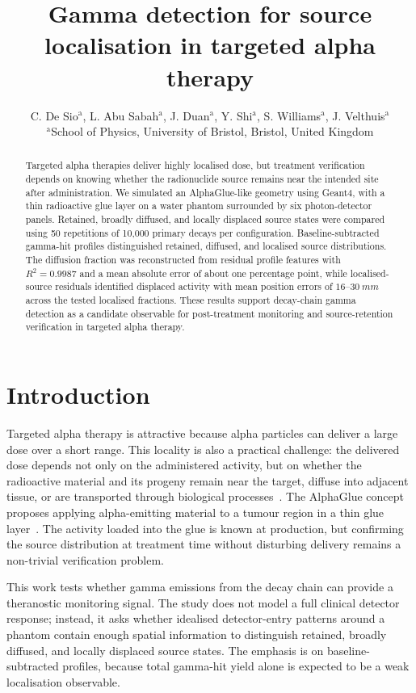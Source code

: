 \documentclass[10pt,twocolumn]{article}
\title{Gamma detection for source localisation in targeted alpha therapy}
\author{
C. De Sio$^{\text{a}}$,
L. Abu Sabah$^{\text{a}}$,
J. Duan$^{\text{a}}$,
Y. Shi$^{\text{a}}$,
S. Williams$^{\text{a}}$,
J. Velthuis$^{\text{a}}$\\
\vspace{0.3em}
\small $^{\text{a}}$School of Physics, University of Bristol, Bristol, United Kingdom
}
\date{}
\makeatletter
\renewcommand{\maketitle}{
\twocolumn[
  \begin{center}
    {\LARGE \@title \par}
    \vspace{0.5em}
    {\normalsize \@author \par}
    \vspace{1em}
  \end{center}
]
}
\makeatother
\begin{document}
\maketitle

\begin{abstract}
Targeted alpha therapies deliver highly localised dose, but treatment
verification depends on knowing whether the radionuclide source remains near
the intended site after administration.  We simulated an AlphaGlue-like
geometry using Geant4, with a thin radioactive glue layer on a water phantom
surrounded by six photon-detector panels.  Retained, broadly diffused, and
locally displaced source states were compared using 50 repetitions of 10,000
primary decays per configuration.  Baseline-subtracted gamma-hit profiles
distinguished retained, diffused, and localised source distributions.  The
diffusion fraction was reconstructed from residual profile features with
\(R^2=0.9987\) and a mean absolute error of about one percentage point, while
localised-source residuals identified displaced activity with mean position
errors of \(16\)--\(\SI{30}{mm}\) across the tested localised fractions.
These results support decay-chain gamma detection as a candidate observable
for post-treatment monitoring and source-retention verification in targeted
alpha therapy.
\end{abstract}

\section{Introduction}

Targeted alpha therapy is attractive because alpha particles can deliver a
large dose over a short range.  This locality is also a practical challenge:
the delivered dose depends not only on the administered activity, but on
whether the radioactive material and its progeny remain near the target,
diffuse into adjacent tissue, or are transported through biological
processes~\cite{laura,heger}.  The AlphaGlue concept proposes applying
alpha-emitting material to a tumour region in a thin glue layer~\cite{AlphaGlue2025}.
The activity loaded into the glue is known at production, but confirming the
source distribution at treatment time without disturbing delivery remains a
non-trivial verification problem.

This work tests whether gamma emissions from the decay chain can provide a
theranostic monitoring signal.  The study does not model a full clinical
detector response; instead, it asks whether idealised detector-entry patterns
around a phantom contain enough spatial information to distinguish retained,
broadly diffused, and locally displaced source states.  The emphasis is on
baseline-subtracted profiles, because total gamma-hit yield alone is expected
to be a weak localisation observable.
\end{document}
